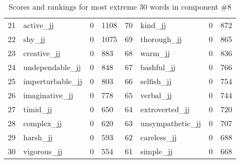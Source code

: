 \begin{table}[tbp]
\begin{tabular}{| rlr@{.}l | rlr@{.}l |}
    21 & active\_jj & 0 & 1108    &    70 & kind\_jj & 0 & 872 \\
    22 & shy\_jj & 0 & 1075    &    69 & thorough\_jj & 0 & 865 \\
    23 & creative\_jj & 0 & 883    &    68 & warm\_jj & 0 & 836 \\
    24 & undependable\_jj & 0 & 848    &    67 & bashful\_jj & 0 & 766 \\
    25 & imperturbable\_jj & 0 & 803    &    66 & selfish\_jj & 0 & 754 \\
    26 & imaginative\_jj & 0 & 778    &    65 & verbal\_jj & 0 & 744 \\
    27 & timid\_jj & 0 & 650    &    64 & extroverted\_jj & 0 & 720 \\
    28 & complex\_jj & 0 & 620    &    63 & unsympathetic\_jj & 0 & 707 \\
    29 & harsh\_jj & 0 & 593    &    62 & careless\_jj & 0 & 688 \\
    30 & vigorous\_jj & 0 & 554    &    61 & simple\_jj & 0 & 668 \\
    \hline
    \end{tabular}
    \caption{Scores and rankings for most extreme 30 words in component \#8} 
\end{table}
\clearpage
